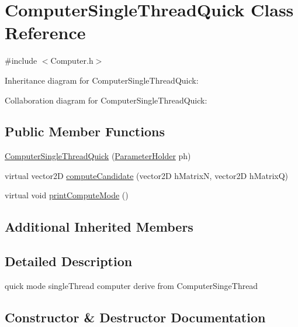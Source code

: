 \hypertarget{classComputerSingleThreadQuick}{}\section{Computer\+Single\+Thread\+Quick Class Reference}
\label{classComputerSingleThreadQuick}


{\ttfamily \#include $<$Computer.\+h$>$}



Inheritance diagram for Computer\+Single\+Thread\+Quick\+:


Collaboration diagram for Computer\+Single\+Thread\+Quick\+:
\subsection*{Public Member Functions}
\begin{DoxyCompactItemize}
\item 
\hyperlink{classComputerSingleThreadQuick_aa3916eba09cb49792d657bb143527d1f}{Computer\+Single\+Thread\+Quick} (\hyperlink{structParameterHolder}{Parameter\+Holder} ph)
\item 
virtual vector2D \hyperlink{classComputerSingleThreadQuick_a86a718c5ec453abd3465d21d6ed2f359}{compute\+Candidate} (vector2D h\+MatrixN, vector2D h\+MatrixQ)
\item 
virtual void \hyperlink{classComputerSingleThreadQuick_a9aa75156bebb86ba240f9194c15fa13e}{print\+Compute\+Mode} ()
\end{DoxyCompactItemize}
\subsection*{Additional Inherited Members}


\subsection{Detailed Description}
quick mode single\+Thread computer derive from Computer\+Singe\+Thread 

\subsection{Constructor \& Destructor Documentation}
